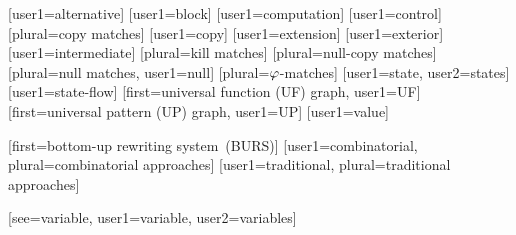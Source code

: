 [user1={alternative}]
[user1={block}]
[user1={computation}]
[user1={control}]
[plural={copy matches}]
[user1={copy}]
[user1={extension}]
[user1={exterior}]
[user1={intermediate}]
[plural={kill matches}]
[plural={null-copy matches}]
[plural={null matches}, user1={null}]
[plural={$\varphi$-matches}]
[user1={state}, user2={states}]
[user1={state-flow}]
[first={universal function (UF) graph}, user1={UF}]
[first={universal pattern (UP) graph}, user1={UP}]
[user1={value}]

%
        [first=bottom-up rewriting system~(BURS)]
%
        [user1={combinatorial}, plural={combinatorial approaches}]
%
        [user1={traditional}, plural={traditional approaches}]

[see={variable}, user1={variable}, user2={variables}]

